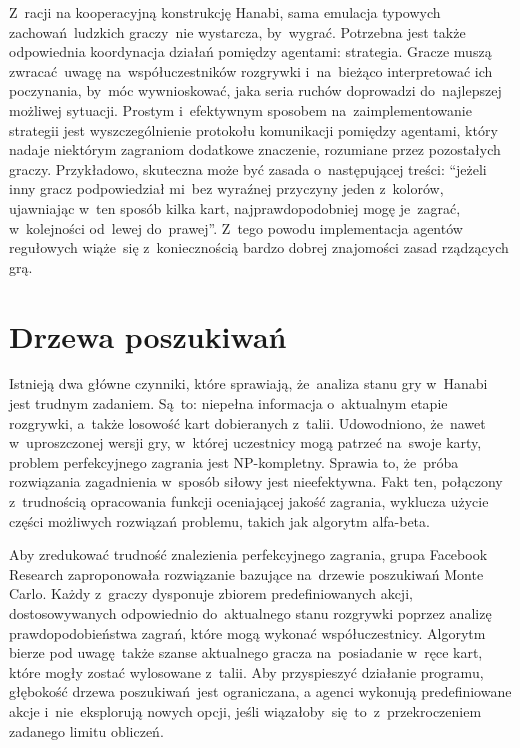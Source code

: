 \documentclass[declaration,shortabstract,inz]{iithesis}
\begin{document}
Z~racji na kooperacyjną konstrukcję Hanabi, sama emulacja typowych zachowań ludzkich graczy~nie wystarcza, by~wygrać. Potrzebna jest także odpowiednia koordynacja działań pomiędzy agentami: strategia. Gracze muszą zwracać uwagę na~współuczestników rozgrywki i~na~bieżąco interpretować ich poczynania, by~móc wywnioskować, jaka seria ruchów doprowadzi do~najlepszej możliwej sytuacji. Prostym i~efektywnym sposobem na~zaimplementowanie strategii jest wyszczególnienie protokołu komunikacji pomiędzy agentami, który nadaje niektórym zagraniom dodatkowe znaczenie, rozumiane przez pozostałych graczy. Przykładowo, skuteczna może być zasada o~następującej treści: ``jeżeli inny gracz podpowiedział mi~bez wyraźnej przyczyny jeden z~kolorów, ujawniając w~ten sposób kilka kart, najprawdopodobniej mogę je~zagrać, w~kolejności od~lewej do~prawej''. Z~tego powodu implementacja agentów regułowych wiąże~się z~koniecznością bardzo dobrej znajomości zasad rządzących grą.

\section{Drzewa poszukiwań}

Istnieją dwa główne czynniki, które sprawiają, że~analiza stanu gry w~Hanabi jest trudnym zadaniem. Są~to: niepełna informacja o~aktualnym etapie rozgrywki, a~także losowość kart dobieranych z~talii. Udowodniono, że~nawet w~uproszczonej wersji gry, w~której uczestnicy mogą patrzeć na~swoje karty, problem perfekcyjnego zagrania jest NP-kompletny\cite{NP-Complete}. Sprawia to, że~próba rozwiązania zagadnienia w~sposób siłowy jest nieefektywna. Fakt ten, połączony z~trudnością opracowania funkcji oceniającej jakość zagrania, wyklucza użycie części możliwych rozwiązań problemu, takich jak algorytm alfa-beta.

Aby zredukować trudność znalezienia perfekcyjnego zagrania, grupa Facebook Research zaproponowała rozwiązanie bazujące na~drzewie poszukiwań Monte Carlo\cite{MCTS}. Każdy z~graczy dysponuje zbiorem predefiniowanych akcji, dostosowywanych odpowiednio do~aktualnego stanu rozgrywki poprzez analizę prawdopodobieństwa zagrań, które mogą wykonać współuczestnicy. Algorytm bierze pod uwagę także szanse aktualnego gracza na~posiadanie w~ręce kart, które mogły zostać wylosowane z~talii. Aby przyspieszyć działanie programu, głębokość drzewa poszukiwań jest ograniczana, a agenci wykonują predefiniowane akcje i~nie~eksplorują nowych opcji, jeśli wiązałoby~się to~z~przekroczeniem zadanego limitu obliczeń.
\end{document}

